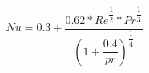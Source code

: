 \documentclass[asme2ejs.tex]{subfiles}
\begin{document}
\begin{equation}
Nu = 0.3 + \dfrac{0.62*Re^{\dfrac{1}{2}}*Pr^{\dfrac{1}{3}}}{\left( 1+{{\dfrac{0.4}{pr}}}\right) ^{\dfrac{1}{4}}  } 
\end{equation}
\end{document}
